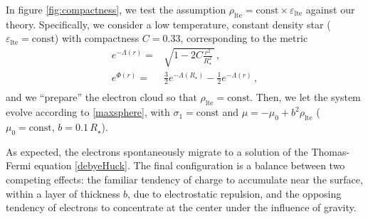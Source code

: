 \documentclass[a4paper, amsfonts, amssymb, amsmath, reprint, showkeys, nofootinbib, twoside,notitlepage]{revtex4-1}
\theoremstyle{definition}
\theoremstyle{theorem}
\begin{document}
In figure \ref{fig:compactness}, we test the assumption $\rho_\text{lte}=\text{const} \times \varepsilon_\text{lte}$ against our theory. Specifically, we consider a low temperature, constant density star ($\varepsilon_\text{lte}{=}\text{const}$) with compactness $C{=}0.33$, corresponding to the metric \cite[\S 11.6]{Weinberg_book_1972}
\vspace{-0.1cm}
\begin{equation}
\begin{split}
 e^{-\Lambda(r)}={}& \sqrt{1{-}2C \tfrac{r^2}{R_\star^2}\,} \, , \\ 
 e^{\Phi(r)}={}& \tfrac{3}{2}e^{-\Lambda(R_\star)}-\tfrac{1}{2}e^{-\Lambda(r)}\, , \\
\end{split}
\end{equation}
and we ``prepare'' the electron cloud so that $\rho_\text{lte}=\text{const}$. Then, we let the system evolve according to \eqref{maxsphere}, with $\sigma_1=\text{const}$ and $\mu=-\mu_0+b^2\rho_\text{lte}$ ($\mu_0=\text{const}$, $b=0.1\, R_\star$).

As expected, the electrons spontaneously migrate to a solution of the Thomas-Fermi equation \eqref{debyeHuck}. The final configuration is a balance between two competing effects: the familiar tendency of charge to accumulate near the surface, within a layer of thickness $b$, due to electrostatic repulsion, and the opposing tendency of electrons to concentrate at the center under the influence of gravity.

\end{document}
